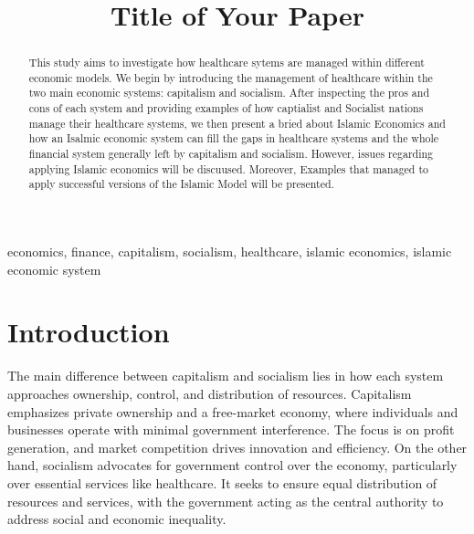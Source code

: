\documentclass[conference]{IEEEtran}
\begin{document}
\title{Title of Your Paper}

\author{
}

\maketitle

\begin{abstract}
This study aims to investigate how healthcare sytems are managed within
different economic models. We begin by introducing the management of healthcare
within the two main economic systems: capitalism and socialism. After inspecting the
pros and cons of each system and providing examples of how captialist and Socialist
nations manage their healthcare systems, we then present a bried about Islamic Economics
and how an Isalmic economic system can fill the gaps in healthcare systems and the whole
financial system generally left by capitalism and socialism. However, issues regarding applying
Islamic economics will be discuused. Moreover, Examples that managed to apply successful versions
of the Islamic Model will be presented. 
\end{abstract}

\begin{IEEEkeywords}
economics, finance, capitalism, socialism, healthcare, islamic economics,
islamic economic system
\end{IEEEkeywords}

\section{Introduction}

\par 
The main difference between capitalism and socialism 
lies in how each system approaches ownership, control, and distribution of resources. 
Capitalism emphasizes private ownership and a free-market economy, 
where individuals and businesses operate with minimal government interference. 
The focus is on profit generation, and market competition drives innovation and efficiency.
On the other hand, socialism advocates for government control over the economy, 
particularly over essential services like healthcare. 
It seeks to ensure equal distribution of resources and services, 
with the government acting as the central authority to address social and economic inequality.
\end{document}
